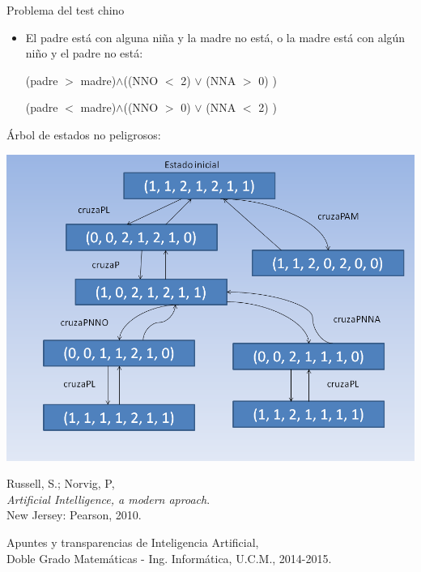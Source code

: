 \documentclass[11pt, a4paper, spanish, openright, twoside]{book}
\begin{document}
\begin{section}{Problema del test chino}
\begin{itemize}
\begin{itemize}
				(policia $>$ ladron)$\land$((NNO $<$ 2) $\lor$ (NNA $<$ 2) $\lor$ (padre $<$ 1) $\lor$ (madre $<$ 1))
				
			\item El ladrón está en el lado izquierdo:
			
				(policia $<$ ladron)$\land$((NNO $>$ 0) $\lor$ (NNA $>$ 0) $\lor$ (padre $>$ 0) $\lor$ (madre $>$ 0))
		\end{itemize}
		
		\item El padre está con alguna niña y la madre no está, o la madre está con algún niño y el padre no está:
			
				(padre $>$ madre)$\land$((NNO $<$ 2) $\lor$ (NNA $>$ 0) )
			
				(padre $<$ madre)$\land$((NNO $>$ 0) $\lor$ (NNA $<$ 2) )
	
		
	
	\end{itemize}

	Árbol de estados no peligrosos:
\begin{center}
\includegraphics[scale=0.65]{arbol.png}
\end{center}
	
\begin{thebibliography}{9}

	Russell, S.; Norvig, P, \\
	\emph{Artificial Intelligence, a modern aproach}.\\
	New Jersey: Pearson, 2010.
	
	Apuntes y transparencias de Inteligencia Artificial, \\
	Doble Grado Matemáticas - Ing. Informática, U.C.M., 2014-2015.

\end{thebibliography}
\end{section}
\end{document}
